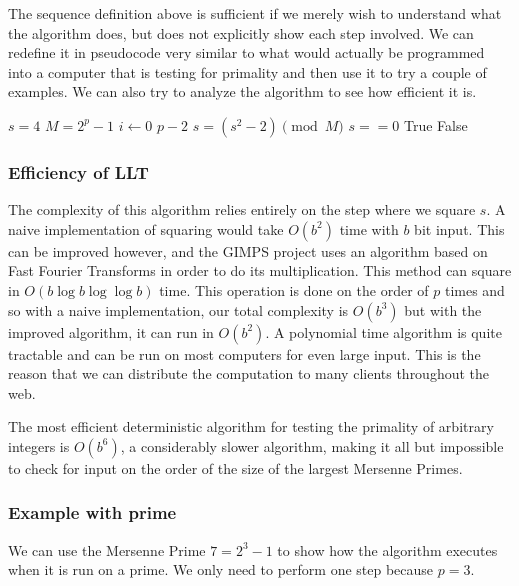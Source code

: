 The sequence definition above is sufficient if we merely wish to understand what the algorithm does, but does not explicitly show each step involved.  We can redefine it in pseudocode very similar to what would actually be programmed into a computer that is testing for primality and then use it to try a couple of examples. We can also try to analyze the algorithm to see how efficient it is.

\begin{codebox}
\li$s = 4$
\li$M = 2^p - 1$
\li \For $i \gets 0$ \To $p - 2$
\Do\li
$s = (s^2 - 2) \pmod{M}$
\End\li
\If $s == 0$
\Then
\li\Return True \li
\Else
\li\Return False
\End
\end{codebox}


\subsubsection{Efficiency of LLT}
The complexity of this algorithm relies entirely on the step where we square $s$. A naive implementation of squaring would take $O(b^2)$ time with $b$ bit input.  This can be improved however, and the GIMPS project uses an algorithm based on Fast Fourier Transforms in order to do its multiplication. This method can square in $O(b\log{b}\log{\log{b}})$ time.  This operation is done on the order of $p$ times and so with a naive implementation, our total complexity is $O(b^3)$ but with the improved algorithm, it can run in $O(b^2)$. A polynomial time algorithm is quite tractable and can be run on most computers for even large input.  This is the reason that we can distribute the computation to many clients throughout the web. 

The most efficient deterministic algorithm for testing the primality of arbitrary integers is $O(b^6)$, a considerably slower algorithm, making it all but impossible to check for input on the order of the size of the largest Mersenne Primes.

\subsubsection{Example with prime}

We can use the Mersenne Prime $7=2^3 -1$ to show how the algorithm executes when it is run on a prime. We only need to perform one step because $p=3$.

